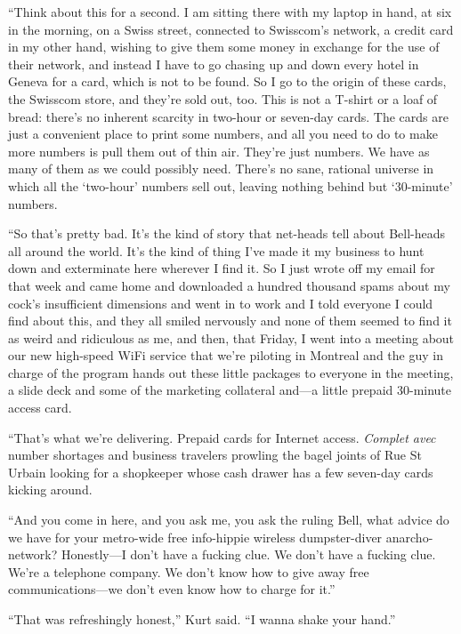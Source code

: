 \documentclass{article}
\begin{document}
``Think about this for a second.  I am sitting there with my laptop in
hand, at six in the morning, on a Swiss street, connected to
Swisscom's network, a credit card in my other hand, wishing to give
them some money in exchange for the use of their network, and instead
I have to go chasing up and down every hotel in Geneva for a card,
which is not to be found.  So I go to the origin of these cards, the
Swisscom store, and they're sold out, too.  This is not a T-shirt or a
loaf of bread:  there's no inherent scarcity in two-hour or seven-day
cards.  The cards are just a convenient place to print some numbers,
and all you need to do to make more numbers is pull them out of thin
air.  They're just numbers.  We have as many of them as we could
possibly need.  There's no sane, rational universe in which all the
`two-hour' numbers sell out, leaving nothing behind but `30-minute'
numbers.

``So that's pretty bad.  It's the kind of story that net-heads tell
about Bell-heads all around the world.  It's the kind of thing I've
made it my business to hunt down and exterminate here wherever I find
it.  So I just wrote off my email for that week and came home and
downloaded a hundred thousand spams about my cock's insufficient
dimensions and went in to work and I told everyone I could find about
this, and they all smiled nervously and none of them seemed to find it
as weird and ridiculous as me, and then, that Friday, I went into a
meeting about our new high-speed WiFi service that we're piloting in
Montreal and the guy in charge of the program hands out these little
packages to everyone in the meeting, a slide deck and some of the
marketing collateral and---a little prepaid 30-minute access card.

``That's what we're delivering.  Prepaid cards for Internet access. 
\textit{Complet avec} number shortages and business travelers prowling
the bagel joints of Rue St Urbain looking for a shopkeeper whose cash
drawer has a few seven-day cards kicking around.

``And you come in here, and you ask me, you ask the ruling Bell, what
advice do we have for your metro-wide free info-hippie wireless
dumpster-diver anarcho-network?  Honestly---I don't have a fucking
clue.  We don't have a fucking clue.  We're a telephone company.  We
don't know how to give away free communications---we don't even know
how to charge for it.''

``That was refreshingly honest,'' Kurt said.  ``I wanna shake your
hand.''
\end{document}
